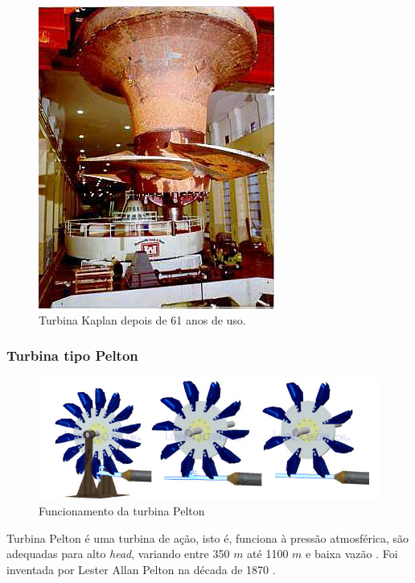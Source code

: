     \begin{figure}[htb]
        \centering
        \caption {\label {fig4:turbina_kaplan} Turbina Kaplan depois de 61 anos de uso. }
        \includegraphics[scale=0.6]{images/fig4.jpg}
    \end{figure}

\subsubsection{Turbina tipo Pelton}

    \begin{figure}[htb]
        \centering
        \caption {\label{fig5:turbina_pelton} Funcionamento da turbina Pelton}
        \includegraphics[scale=0.5]{images/fig5.png}
    \end{figure}

    Turbina Pelton é uma turbina de ação, isto é, funciona à pressão atmosférica, são adequadas para alto \textit{head}, variando entre 350 $m$ até 1100 $m$ e baixa vazão \cite{pelton_turbine}. Foi inventada por Lester Allan Pelton na década de 1870 \cite{turbina_pelton}.

